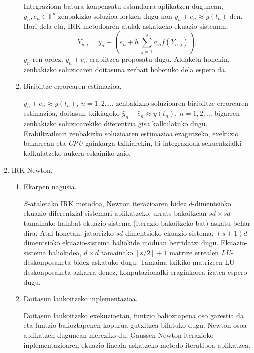 \begin{enumerate}
\begin{enumerate}
Integrazioan batura konpensatu estandarra aplikatzen dugunean, $\tilde{y}_n, e_n \in \mathbb{F}^d$ zenbakizko soluzioa  lortzen dugu non $\tilde{y}_n+e_n \approx y(t_n)$ den. Hori dela-eta, IRK metodoaren atalak askatzeko ekuazio-sisteman,
\begin{equation*}
Y_{n,i}=\tilde{y}_n + \left(e_n+ h \ \sum_{j=1}^{s} a_{ij} f(Y_{n,j}) \right),
\end{equation*}
$\tilde{y}_n$-ren ordez, $\tilde{y}_n+e_n$ erabiltzea proposatu dugu. Aldaketa honekin, zenbakizko soluzioaren doitasuna zerbait hobetuko dela espero da.


  
\item Biribiltze errorearen estimazioa.

$\tilde{y}_n+e_n \approx y(t_n), \ n=1,2,\dots$ zenbakizko soluzioaren  biribiltze errorearen estimazioa, doitasun txikiagoko $\hat{y}_n+\hat{e}_n \approx y(t_n), \ n=1,2,\dots$ bigarren zenbakizko soluzioarekiko  diferentzia gisa kalkulatuko dugu.
Erabiltzaileari zenbakizko soluzioaren estimazioa ezagutzeko, exekuzio bakarrean  eta \emph{CPU} gainkarga txikiarekin, bi integrazioak sekuentzialki kalkulatzeko aukera eskainiko zaio. 


\end{enumerate}


\item IRK Newton.

\begin{enumerate}
\item Ekarpen nagusia.

$S$-ataletako IRK metodoa,  Newton iterazioaren bidez $d$-dimentsioko ekuazio diferentzial  sistemari aplikatzeko, urrats bakoitzean $sd \times sd$ tamainako hainbat ekuazio sistema (iterazio bakoitzeko bat) askatu behar dira. Atal honetan, jatorrizko $sd$-dimentsioko ekuazio sistema, $(s+1)d$ dimentsioko ekuazio-sistema baliokide moduan berridatzi dugu. Ekuazio-sistema baliokidea,  $d \times d$ tamainako $[s/2]+1$ matrize errealen \emph{LU}-deskonposaketa bidez askatuko dugu. Tamaina txikiko matrizeen LU deskonposaketa azkarra denez, konputazionalki eraginkorra izatea espero dugu.   

\item Doitasun laukoitzeko inplementazioa.

Doitasun laukoitzeko exekuzioetan, funtzio balioztapena oso garestia da eta funtzio balioztapenen kopurua gutxitzea bilatuko dugu. Newton osoa aplikatzen dugunean mereziko du, Gaussen Newton iterazioko inplementazioaren ekuazio lineala askatzeko metodo iteratiboa aplikatzea. 


\end{enumerate}
\end{enumerate}

